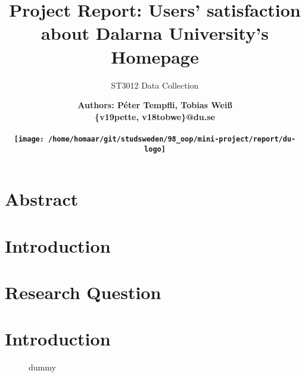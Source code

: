 \documentclass[12pt,a4paper,paper=a4,oneside,titlepage,pdftex]{scrartcl}
\begin{document}
	

\title{Project Report: Users' satisfaction about Dalarna University's Homepage}
\subtitle{ST3012 Data Collection}
\author{
	\bfseries\Large Authors: Péter Tempfli, Tobias Weiß\\
	\{v19pette, v18tobwe\}@du.se
	\\ \\
	\texttt{[image: /home/homaar/git/studsweden/98\_oop/mini-project/report/du-logo]}\\
}

\maketitle
\tableofcontents
\vspace{25px}

\section{Abstract}

\section{Introduction}

\section{Research Question}

\section{Introduction}

\begin{figure}[H]
    \centering
    \caption{dummy}
    \label{fig:XXX}
    
\end{figure}
\end{document}
